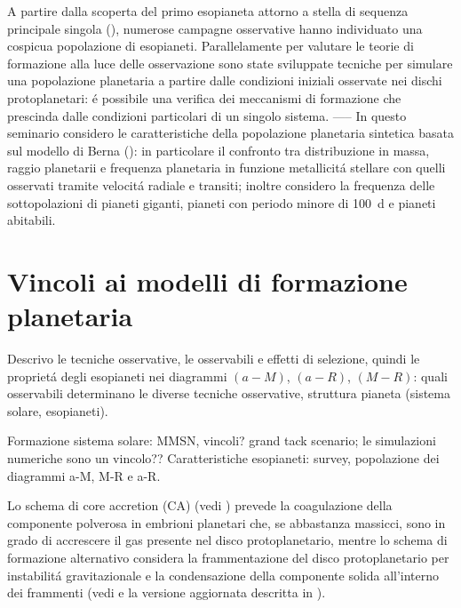 \documentclass[twoside,11pt,fleqn]{memoir}%
\begin{document}
\begin{workout}
A partire dalla scoperta del primo esopianeta attorno a stella di sequenza principale singola (\cite{mayor1995jupiter}), numerose campagne osservative hanno individuato una cospicua popolazione di esopianeti. Parallelamente per valutare le teorie di formazione alla luce delle osservazione sono state sviluppate tecniche per simulare una popolazione planetaria a partire dalle condizioni iniziali osservate nei dischi protoplanetari: \'e possibile una verifica dei meccanismi di formazione che prescinda dalle condizioni particolari di un singolo sistema.
-----
In questo seminario considero le caratteristiche della popolazione planetaria sintetica basata sul modello di Berna (\cite{mordasini2018planetary}): in particolare il confronto tra distribuzione in massa, raggio planetarii e frequenza planetaria in funzione metallicit\'a stellare con quelli osservati tramite velocit\'a radiale e transiti; inoltre considero la frequenza delle sottopolazioni di pianeti giganti, pianeti con periodo minore di \SI{100}{\day} e pianeti abitabili.
\end{workout}

{\let\clearpage\relax\let\cleardoublepage\relax
\part{Vincoli ai modelli di formazione planetaria}
}
\begin{errata}
Descrivo le tecniche osservative, le osservabili e effetti di selezione, quindi le propriet\'a degli esopianeti nei diagrammi $(a-M)$, $(a-R)$, $(M-R)$: quali osservabili determinano le diverse tecniche osservative, struttura pianeta (sistema solare, esopianeti).
\end{errata}

\begin{workout}
Formazione sistema solare: MMSN, vincoli? grand tack scenario; le simulazioni numeriche sono un vincolo??
Caratteristiche esopianeti: survey, popolazione dei diagrammi a-M, M-R e a-R.

\end{workout}

\begin{workout}
Lo schema di core accretion (CA) (vedi \cite{safronov1972evolution}) prevede la coagulazione della componente polverosa in embrioni planetari che, se abbastanza massicci, sono in grado di accrescere il gas presente nel disco protoplanetario, mentre lo schema di formazione alternativo considera la frammentazione del disco protoplanetario per instabilit\'a gravitazionale e la condensazione della componente solida all'interno dei frammenti (vedi \cite{kuiper1951origin} e la versione aggiornata descritta in \cite{nayakshin2017dawes}).
\end{workout}
\end{document}

